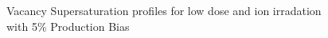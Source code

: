 \documentclass[a4paper]{article}
\begin{document}
      \begin{figure}[h!]  %
        \centering
        \qquad
        \caption{Vacancy Supersaturation profiles for low dose and ion irradation with 5\% Production Bias}
        \label{figure:vacancy_supersaturation_ion_5}
      \end{figure}
\end{document}
